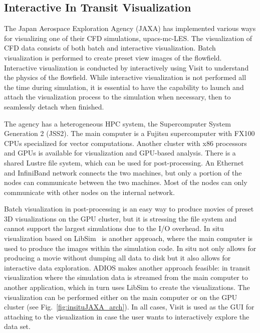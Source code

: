 





\subsection{Interactive In Transit Visualization}
\label{sec:jaxa}
The Japan Aerospace Exploration Agency (JAXA) has implemented various ways for visualizing one of their CFD simulations, upacs-mc-LES. The visualization of CFD data consists of both batch and interactive visualization. Batch visualization is performed to create preset view images of the flowfield. Interactive visualization is conducted by interactively using Visit to understand the physics of the flowfield. While interactive visualization is not performed all the time during simulation, it is essential to have the capability to launch and attach the visualization process to the simulation when necessary, then to seamlessly detach when finished.

The agency has a heterogeneous HPC system, the Supercomputer System Generation 2 (JSS2). The main computer is a Fujitsu supercomputer with FX100 CPUs specialized for vector computations. Another cluster with x86 processors and GPUs is available for visualization and GPU-based analysis. There is a shared Lustre file system, which can be used for post-processing. An Ethernet and InfiniBand network connects the two machines, but only a portion of the nodes can communicate between the two machines. Most of the nodes can only communicate with other nodes on the internal network.

Batch visualization in post-processing is an easy way to produce movies of preset 3D visualizations on the GPU cluster, but it is stressing the file system and cannot support the largest simulations due to the I/O overhead. In situ visualization based on LibSim~\cite{libsim} is another approach, where the main computer is used to produce the images within the simulation code. In situ not only allows for producing a movie without dumping all data to disk but it also allows for interactive data exploration. ADIOS makes another approach feasible: in transit visualization where the simulation data is streamed from the main computer to another application, which in turn uses LibSim to create the visualizations. The visualization can be performed either on the main computer or on the GPU cluster (see Fig.~\ref{fig:insituJAXA_arch}). In all cases, Visit is used as the GUI for attaching to the visualization in case the user wants to interactively explore the data set.

